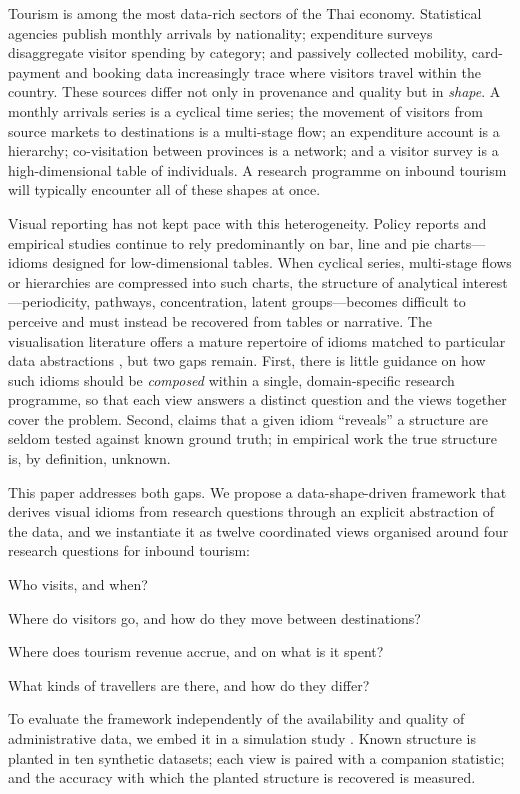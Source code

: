 \documentclass{article}
\begin{document}
Tourism is among the most data-rich sectors of the Thai economy. Statistical agencies publish monthly
arrivals by nationality; expenditure surveys disaggregate visitor spending by category; and passively
collected mobility, card-payment and booking data increasingly trace where visitors travel within the
country. These sources differ not only in provenance and quality but in \emph{shape}. A monthly arrivals
series is a cyclical time series; the movement of visitors from source markets to destinations is a
multi-stage flow; an expenditure account is a hierarchy; co-visitation between provinces is a network; and a
visitor survey is a high-dimensional table of individuals. A research programme on inbound tourism will
typically encounter all of these shapes at once.

Visual reporting has not kept pace with this heterogeneity. Policy reports and empirical studies continue to
rely predominantly on bar, line and pie charts---idioms designed for low-dimensional tables. When cyclical
series, multi-stage flows or hierarchies are compressed into such charts, the structure of analytical
interest---periodicity, pathways, concentration, latent groups---becomes difficult to perceive and must
instead be recovered from tables or narrative. The visualisation literature offers a mature repertoire of
idioms matched to particular data abstractions \citep{heer2010zoo,munzner2014}, but two gaps remain. First,
there is little guidance on how such idioms should be \emph{composed} within a single, domain-specific
research programme, so that each view answers a distinct question and the views together cover the problem.
Second, claims that a given idiom ``reveals'' a structure are seldom tested against known ground truth; in
empirical work the true structure is, by definition, unknown.

This paper addresses both gaps. We propose a data-shape-driven framework that derives visual idioms from
research questions through an explicit abstraction of the data, and we instantiate it as twelve coordinated
views organised around four research questions for inbound tourism:
\begin{description}[leftmargin=3.2em,labelwidth=2.6em,itemsep=1pt]
  \item[RQ1] Who visits, and when?
  \item[RQ2] Where do visitors go, and how do they move between destinations?
  \item[RQ3] Where does tourism revenue accrue, and on what is it spent?
  \item[RQ4] What kinds of travellers are there, and how do they differ?
\end{description}
To evaluate the framework independently of the availability and quality of administrative data, we embed
it in a simulation study \citep{morris2019}. Known structure is planted in ten synthetic datasets; each view
is paired with a companion statistic; and the accuracy with which the planted structure is recovered is
measured.
\end{document}
